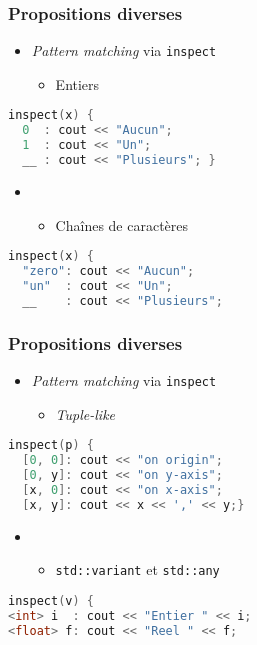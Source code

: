 \documentclass[C++.tex]{subfiles}
\begin{document}
\begin{frame}[fragile]
	\frametitle{Propositions diverses}
	\begin{itemize}
		\item \textit{Pattern matching} via \lstinline|inspect|
		\begin{itemize}
			\item Entiers
		\end{itemize}
	\end{itemize}

	\begin{lstlisting}[language=C++]
inspect(x) {
  0  : cout << "Aucun";
  1  : cout << "Un";
  __ : cout << "Plusieurs"; }\end{lstlisting}


	\begin{itemize}
		\item [] \begin{itemize}
			\item Chaînes de caractères
		\end{itemize}
	\end{itemize}

	\begin{lstlisting}[language=C++]
inspect(x) {
  "zero": cout << "Aucun";
  "un"  : cout << "Un";
  __    : cout << "Plusieurs";\end{lstlisting}
\end{frame}

\begin{frame}[fragile]
	\frametitle{Propositions diverses}
	\begin{itemize}
		\item \textit{Pattern matching} via \lstinline|inspect|
		\begin{itemize}
			\item \textit{Tuple-like}

		\end{itemize}
	\end{itemize}

	\begin{lstlisting}[language=C++]
inspect(p) {
  [0, 0]: cout << "on origin";
  [0, y]: cout << "on y-axis";
  [x, 0]: cout << "on x-axis";
  [x, y]: cout << x << ',' << y;}\end{lstlisting}

	\begin{itemize}
		\item [] \begin{itemize}
			\item \lstinline|std::variant| et \lstinline|std::any|
		\end{itemize}
	\end{itemize}

	\begin{lstlisting}[language=C++]
inspect(v) {
<int> i  : cout << "Entier " << i;
<float> f: cout << "Reel " << f;\end{lstlisting}
\end{frame}
\end{document}
